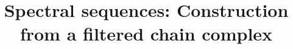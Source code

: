 \documentclass{ximera}
\title{Spectral sequences: Construction from a filtered chain complex}
\begin{document}
\begin{abstract}

\end{abstract}
\maketitle

\end{document}
